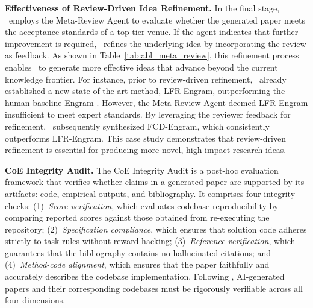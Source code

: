 
\noindent\textbf{Effectiveness of Review-Driven Idea Refinement.} In the final stage, \sname~employs the Meta-Review Agent to evaluate whether the generated paper meets the acceptance standards of a top-tier venue. If the agent indicates that further improvement is required, \sname~refines the underlying idea by incorporating the review as feedback. As shown in Table~\ref{tab:abl_meta_review}, this refinement process enables \sname~to generate more effective ideas that advance beyond the current knowledge frontier. For instance, prior to review-driven refinement, \sname~already established a new state-of-the-art method, LFR-Engram, outperforming the human baseline Engram \citep{kwon2026ai}. However, the Meta-Review Agent deemed LFR-Engram insufficient to meet expert standards. By leveraging the reviewer feedback for refinement, \sname~subsequently synthesized FCD-Engram, which consistently outperforms LFR-Engram. This case study demonstrates that review-driven refinement is essential for producing more novel, high-impact research ideas.


\noindent\textbf{CoE Integrity Audit.} The CoE Integrity Audit \citep{meng2026scientistone} is a post-hoc evaluation framework that verifies whether claims in a generated paper are supported by its artifacts: code, empirical outputs, and bibliography. It comprises four integrity checks: (1)~\textit{Score verification}, which evaluates codebase reproducibility by comparing reported scores against those obtained from re-executing the repository; (2)~\textit{Specification compliance}, which ensures that solution code adheres strictly to task rules without reward hacking; (3)~\textit{Reference verification}, which guarantees that the bibliography contains no hallucinated citations; and (4)~\textit{Method-code alignment}, which ensures that the paper faithfully and accurately describes the codebase implementation. Following \citet{meng2026scientistone}, AI-generated papers and their corresponding codebases must be rigorously verifiable across all four dimensions.

